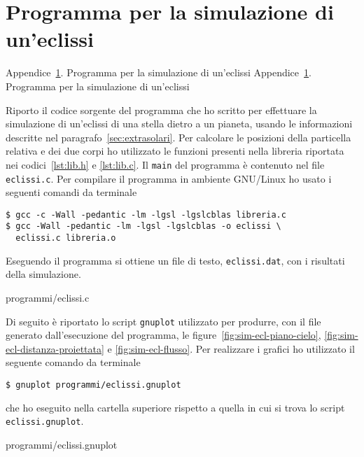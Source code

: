 \cleardoublepage{}
\chapter{Programma per la simulazione di un'eclissi}
\label{cha:simulazione-eclissi}
\markboth%
{Appendice~\ref{cha:simulazione-eclissi}. Programma per la simulazione di
  un'eclissi}%
{Appendice~\ref{cha:simulazione-eclissi}. Programma per la simulazione di
  un'eclissi}

Riporto il codice sorgente del programma che ho scritto per effettuare la
simulazione di un'eclissi di una stella dietro a un pianeta, usando le
informazioni descritte nel paragrafo~\ref{sec:extrasolari}. Per calcolare le
posizioni della particella relativa e dei due corpi ho utilizzato le funzioni
presenti nella libreria riportata nei codici~\ref{lst:lib.h} e
\ref{lst:lib.c}. Il \verb|main| del programma è contenuto nel file
\verb|eclissi.c|. Per compilare il programma in ambiente GNU/Linux ho usato i
seguenti comandi da terminale
\begin{verbatim}
$ gcc -c -Wall -pedantic -lm -lgsl -lgslcblas libreria.c
$ gcc -Wall -pedantic -lm -lgsl -lgslcblas -o eclissi \
  eclissi.c libreria.o
\end{verbatim}
Eseguendo il programma si ottiene un file di testo, \verb|eclissi.dat|, con i
risultati della simulazione.

{programmi/eclissi.c}

Di seguito è riportato lo script \verb|gnuplot| utilizzato per produrre, con il
file generato dall'esecuzione del programma, le
figure~\ref{fig:sim-ecl-piano-cielo}, \ref{fig:sim-ecl-distanza-proiettata} e
\ref{fig:sim-ecl-flusso}. Per realizzare i grafici ho utilizzato il seguente
comando da terminale
\begin{verbatim}
$ gnuplot programmi/eclissi.gnuplot
\end{verbatim}
che ho eseguito nella cartella superiore rispetto a quella in cui si trova lo
script \verb|eclissi.gnuplot|.

{programmi/eclissi.gnuplot}

